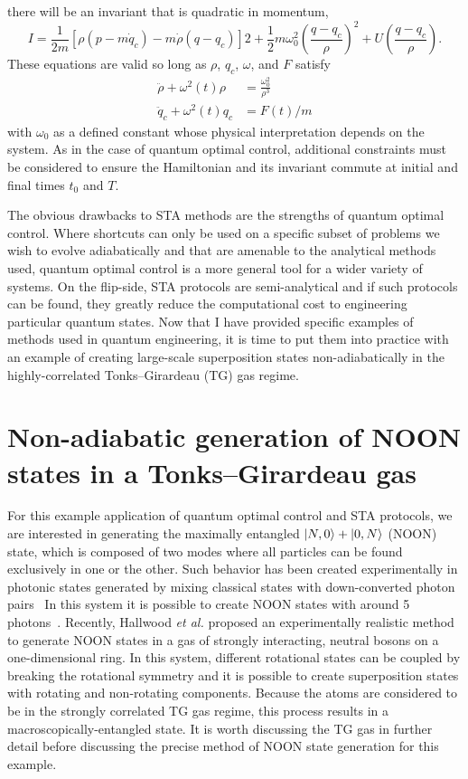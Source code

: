 there will be an invariant that is quadratic in momentum,
\begin{equation}
I = \frac{1}{2m}[\rho(p-m\dot q_c)-m\dot \rho(q-q_c)]2 + \frac{1}{2}m\omega_0^2\left( \frac{q-q_c}{\rho} \right)^2 + U\left( \frac{q-q_c}{\rho}\right).
\end{equation}
\noindent These equations are valid so long as $\rho$, $q_c$, $\omega$, and $F$ satisfy
\begin{align}
\ddot \rho + \omega^2(t)\rho &= \frac{\omega_0^2}{\rho^3} \label{eqn:rho}\\
\ddot q_c + \omega^2(t)q_c &= F(t)/m \label{eqn:qc}
\end{align}
\noindent with $\omega_0$ as a defined constant whose physical interpretation depends on the system.
As in the case of quantum optimal control, additional constraints must be considered to ensure the Hamiltonian and its invariant commute at initial and final times $t_0$ and $T$.

The obvious drawbacks to STA methods are the strengths of quantum optimal control.
Where shortcuts can only be used on a specific subset of problems we wish to evolve adiabatically and that are amenable to the analytical methods used, quantum optimal control is a more general tool for a wider variety of systems.
On the flip-side, STA protocols are semi-analytical and if such protocols can be found, they greatly reduce the computational cost to engineering particular quantum states.
Now that I have provided specific examples of methods used in quantum engineering, it is time to put them into practice with an example of creating large-scale superposition states non-adiabatically in the highly-correlated Tonks--Girardeau (TG) gas regime.

\section{Non-adiabatic generation of NOON states in a Tonks--Girardeau gas}

For this example application of quantum optimal control and STA protocols, we are interested in generating the maximally entangled $\ket{N,0} + \ket{0,N}$ (NOON) state, which is composed of two modes where all particles can be found exclusively in one or the other.
Such behavior has been created experimentally in photonic states generated by mixing classical states with down-converted photon pairs~\cite{isreal2012}
In this system it is possible to create NOON states with around 5 photons~\cite{afek2010}.
Recently, Hallwood \textit{et al.} proposed an experimentally realistic method to generate NOON states in a gas of strongly interacting, neutral bosons on a one-dimensional ring.
In this system, different rotational states can be coupled by breaking the rotational symmetry and it is possible to create superposition states with rotating and non-rotating components.
Because the atoms are considered to be in the strongly correlated TG gas regime, this process results in a macroscopically-entangled state.
It is worth discussing the TG gas in further detail before discussing the precise method of NOON state generation for this example.

